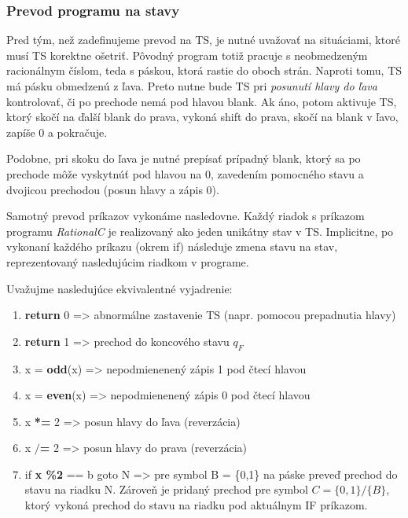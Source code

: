 \documentclass[10pt]{article}
\begin{document}
\subsubsection*{Prevod programu na stavy}
Pred tým, než zadefinujeme prevod na TS, je nutné uvažovať na situáciami, ktoré musí TS korektne
ošetriť. Pôvodný program totiž pracuje s neobmedzeným racionálnym číslom, teda s páskou, ktorá
rastie do oboch strán. Naproti tomu, TS má pásku obmedzenú z ľava. Preto nutne bude TS pri \textit{posunutí
hlavy do ľava} kontrolovať, či po prechode nemá pod hlavou blank. Ak áno, potom aktivuje TS, ktorý
skočí na ďalší blank do prava, vykoná shift do prava, skočí na blank v ľavo, zapíše 0 a pokračuje.

Podobne, pri skoku do ľava je nutné prepísať prípadný blank, ktorý sa po prechode môže vyskytnúť pod
hlavou na 0, zavedením pomocného stavu a dvojicou prechodou (posun hlavy a zápis 0).

Samotný prevod príkazov vykonáme nasledovne. Každý riadok s príkazom programu \textit{RationalC} je realizovaný ako jeden unikátny stav v TS.
Implicitne, po vykonaní každého príkazu (okrem if) následuje zmena stavu na stav, reprezentovaný
nasledujúcim riadkom v programe. 

Uvažujme nasledujúce ekvivalentné vyjadrenie:
\begin{enumerate}
    \item \textbf{return} 0 => abnormálne zastavenie TS (napr. pomocou prepadnutia hlavy)
    \item \textbf{return} 1 => prechod do koncového stavu $q_F$
    \item x = \textbf{odd}(x) => nepodmienenený zápis 1 pod čtecí hlavou
    \item x = \textbf{even}(x) => nepodmienenený zápis 0 pod čtecí hlavou
    \item x \textbf{*=} 2 => posun hlavy do ľava (reverzácia)
    \item x \textbf{$/$=} 2 => posun hlavy do prava (reverzácia)
    \item if \textbf{x \%2} == b goto N => pre symbol B = \{0,1\} na páske preveď prechod do stavu
        na riadku N. Zároveň je pridaný prechod pre symbol $C = \{0,1\}/ \{B\}$, ktorý
        vykoná prechod do stavu na riadku pod aktuálnym IF príkazom.
\end{enumerate}
\end{document}
